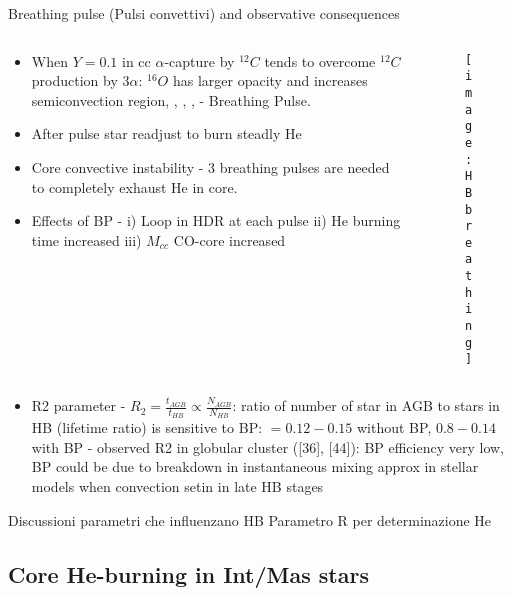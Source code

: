 \begin{frame}{Breathing pulse (Pulsi convettivi) and observative consequences}
\begin{columns}[T]
	\begin{column}{0.4\textwidth}
	\begin{itemize}
        \item When $Y=0.1$ in cc $\alpha$-capture by $^{12}C$ tends to overcome $^{12}C$ production by $3\alpha$: $^{16}O$ has larger opacity and increases semiconvection region, , \xaumenta{\epsilon_{3\alpha}}, ,  - Breathing Pulse.
        \item After pulse star readjust to burn steadly He
        \item Core convective instability - 3 breathing pulses are needed to completely exhaust He in core.
	\item Effects of BP - i) Loop in HDR at each pulse ii) He burning time increased iii) $M_{cc}$ CO-core increased
	\end{itemize}
	\end{column}
	\begin{column}{0.50\textwidth}
	\begin{figure}[!ht]
	\texttt{[image: HBbreathing]}\label{fig:HBbreathing}
	\end{figure}
\end{column}\end{columns}
	\begin{itemize}
        \item R2 parameter - $R_2=\frac{t_{AGB}}{t_{HB}}\propto \frac{N_{AGB}}{N_{HB}}$: ratio of number of star in AGB to stars in HB (lifetime ratio) is sensitive to BP: $=0.12-0.15$ without BP, $0.8-0.14$ with BP - observed R2 in globular cluster ([36], [44]): BP efficiency very low, BP could be due to breakdown in instantaneous mixing approx in stellar models when convection setin in late HB stages
\end{itemize}
\end{frame}

\begin{frame}{Discussioni parametri che influenzano HB}
Parametro R per determinazione He
\end{frame}

\subsection{Core He-burning in Int/Mas stars}

